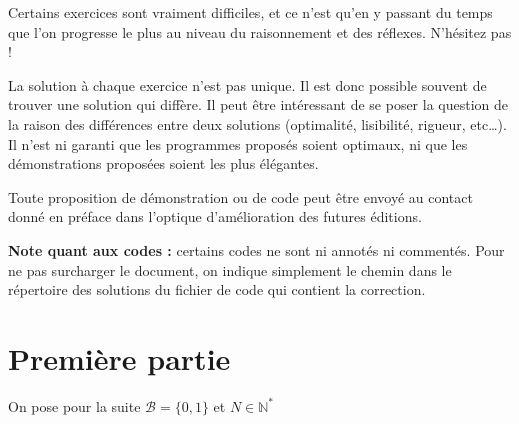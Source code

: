 \documentclass[../main.tex]{subfiles}
\begin{document}
Certains exercices sont vraiment difficiles, et ce n'est qu'en y passant du temps que l'on progresse le plus au niveau du raisonnement et des réflexes. N'hésitez pas !
 
La solution à chaque exercice n'est pas unique. Il est donc possible souvent de trouver une solution qui diffère. Il peut être intéressant de se poser la question de la raison des différences entre deux solutions (optimalité, lisibilité, rigueur, etc\dots). Il n'est ni garanti que les programmes proposés soient optimaux, ni que les démonstrations proposées soient les plus élégantes.

Toute proposition de démonstration ou de code peut être envoyé au contact donné en préface dans l'optique d'amélioration des futures éditions.

\textbf{Note quant aux codes :} certains codes ne sont ni annotés ni commentés. Pour ne pas surcharger le document, on indique simplement le chemin dans le répertoire des solutions du fichier de code qui contient la correction.
\section{Première partie}
On pose pour la suite $\mathcal{B} = \{0, 1\}$ et $N\in\mathbb{N}^{*}$
\end{document}
